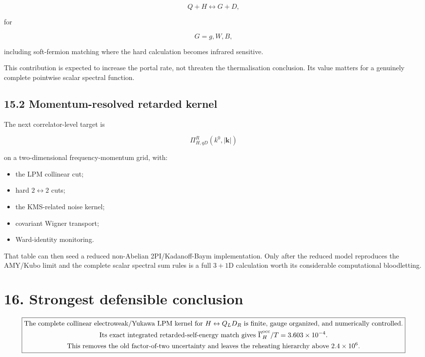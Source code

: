 \documentclass[
  10pt,
]{article}
\providecommand{\tightlist}{%
  \setlength{\itemsep}{0pt}\setlength{\parskip}{0pt}}
\begin{document}
\[
Q+H\leftrightarrow G+D,
\]

for

\[
G=g,W,B,
\]

including soft-fermion matching where the hard calculation becomes
infrared sensitive.

This contribution is expected to increase the portal rate, not threaten
the thermalisation conclusion. Its value matters for a genuinely
complete pointwise scalar spectral function.

\subsection{15.2 Momentum-resolved retarded
kernel}\label{momentum-resolved-retarded-kernel}

The next correlator-level target is

\[
\Pi_{H,qD}^{R}(k^0,|\mathbf k|)
\]

on a two-dimensional frequency-momentum grid, with:

\begin{itemize}
\tightlist
\item
  the LPM collinear cut;
\item
  hard \(2\leftrightarrow2\) cuts;
\item
  the KMS-related noise kernel;
\item
  covariant Wigner transport;
\item
  Ward-identity monitoring.
\end{itemize}

That table can then seed a reduced non-Abelian 2PI/Kadanoff-Baym
implementation. Only after the reduced model reproduces the AMY/Kubo
limit and the complete scalar spectral sum rules is a full \(3+1\)D
calculation worth its considerable computational bloodletting.

\section{16. Strongest defensible
conclusion}\label{strongest-defensible-conclusion}

\[
\boxed{
\begin{gathered}
\text{The complete collinear electroweak/Yukawa LPM kernel for}\
H\leftrightarrow Q_LD_R\text{ is finite, gauge organized, and numerically controlled.}\\
\text{Its exact integrated retarded-self-energy match gives}\
\overline\Gamma_H^{\rm occ}/T=3.603\times10^{-4}.\\
\text{This removes the old factor-of-two uncertainty and leaves the}\
\text{reheating hierarchy above }2.4\times10^6.
\end{gathered}
}
\]
\end{document}
